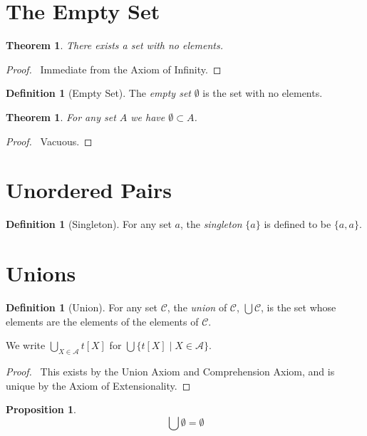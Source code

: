 \documentclass{report}
\let\qed\relax
\newtheorem{prop}[ax]{Proposition}
\newtheorem{thm}[ax]{Theorem}
\theoremstyle{definition}
\newtheorem{df}[ax]{Definition}
\begin{document}
\section{The Empty Set}

\begin{thm}
There exists a set with no elements.
\end{thm}

\begin{proof}
\pf\ Immediate from the Axiom of Infinity. \qed
\end{proof}

\begin{df}[Empty Set]
The \emph{empty set} $\emptyset$ is the set with no elements.
\end{df}

\begin{thm}
For any set $A$ we have $\emptyset \subset A$.
\end{thm}

\begin{proof}
\pf\ Vacuous. \qed
\end{proof}

\section{Unordered Pairs}

\begin{df}[Singleton]
For any set $a$, the \emph{singleton} $\{a\}$ is defined to be $\{a,a\}$.
\end{df}

\section{Unions}

\begin{df}[Union]
For any set $\mathcal{C}$, the \emph{union} of $\mathcal{C}$, $\bigcup \mathcal{C}$, is the set whose elements are the elements of the elements of $\mathcal{C}$.

We write $\bigcup_{X \in \mathcal{A}} t[X]$ for $\bigcup \{t[X] \mid X \in \mathcal{A} \}$.
\end{df}

\begin{proof}
\pf\ This exists by the Union Axiom and Comprehension Axiom, and is unique by the Axiom of Extensionality. \qed
\end{proof}

\begin{prop}
\[ \bigcup \emptyset = \emptyset \]
\end{prop}
\end{document}
